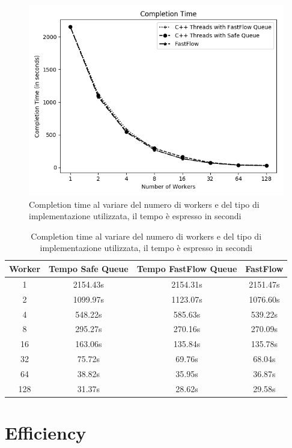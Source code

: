 \documentclass[12pt]{report}
\begin{document}
\begin{figure}[H]
\centering
  \includegraphics[width=0.8\linewidth]{Completion_Time.png}
  \caption{Completion time al variare del numero di workers e del tipo di implementazione utilizzata, il tempo è espresso in secondi}
  \label{CompletionTime}
  
\end{figure}


\begin{table}[H]
\begin{center}
\begin{tabular}[b]{cccc}\hline
      Worker & Tempo Safe Queue & Tempo FastFlow Queue & FastFlow \\ \hline
        1   & 2154.43s & 2154.31s & 2151.47s\\
        2   & 1099.97s & 1123.07s & 1076.60s\\
        4   & 548.22s  & 585.63s  & 539.22s\\
        8   & 295.27s  & 270.16s  & 270.09s\\
        16  & 163.06s  & 135.84s  & 135.78s\\
        32  & 75.72s   & 69.76s   & 68.04s\\
        64  & 38.82s   & 35.95s   & 36.87s\\
        128 & 31.37s   & 28.62s   & 29.58s\\ \hline
\end{tabular}
\end{center}

\caption{\label{tab:TableCompletionTime} Completion time al variare del numero di workers e del tipo di implementazione utilizzata, il tempo è espresso in secondi}
\end{table}
\newpage
\section{Efficiency}
\end{document}
